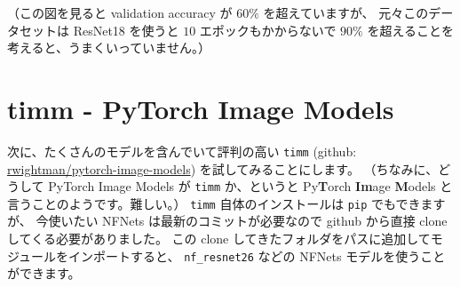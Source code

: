 \documentclass[dvipdfmx,autodetect-engine,10pt,b5paper,papersize,openany,dvipsnames]{jsbook}
\begin{document}
\begin{multicols}{2}
\vspace{5cm}

（この図を見ると validation accuracy が $60 \%$ を超えていますが、
元々このデータセットは ResNet18 を使うと $10$ エポックもかからないで
$90 \%$ を超えることを考えると、うまくいっていません。）


\section{timm - PyTorch Image Models}
次に、たくさんのモデルを含んでいて評判の高い
\texttt{timm} (github: \href{https://github.com/rwightman/pytorch-image-models}{rwightman/pytorch-image-models}) を試してみることにします。
（ちなみに、どうして PyTorch Image Models が \texttt{timm} か、というと
  Py{\bfseries T}orch {\bfseries Im}age {\bfseries M}odels と言うことのようです。難しい。）
\texttt{timm} 自体のインストールは \texttt{pip} でもできますが、
今使いたい NFNets は最新のコミットが必要なので
github から直接 clone してくる必要がありました。
この clone してきたフォルダをパスに追加してモジュールをインポートすると、
\texttt{nf\_resnet26} などの NFNets モデルを使うことができます。




\end{multicols}
\end{document}
